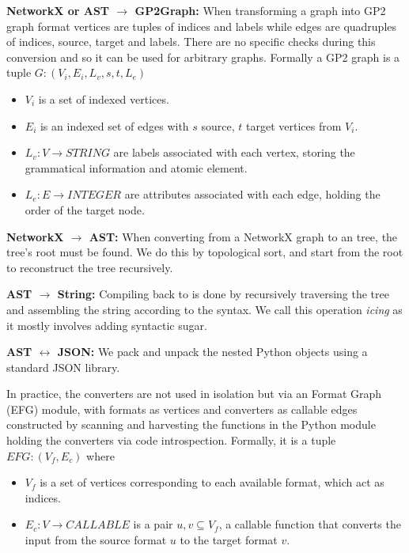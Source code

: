 \documentclass[runningheads]{llncs}
\begin{document}
\noindent \textbf{NetworkX or \essence AST $\rightarrow$  GP2Graph:} When transforming a graph into GP2 graph format vertices are tuples of indices and labels while edges are quadruples of indices, source, target and labels. There are no \essence specific checks during this conversion and so it can be used for arbitrary graphs. Formally a GP2 graph is a tuple $G: (V_i,E_i,L_v,s,t,L_e)$
\begin{itemize}
    \item $V_i$ is a set of indexed vertices.
    \item $E_i$ is an indexed set of edges with $s$ source, $t$ target vertices from $V_i$.
    \item $L_v : V \rightarrow STRING$ are labels associated with each vertex, storing the grammatical information and atomic element.
    \item $L_e : E \rightarrow INTEGER$ are attributes associated with each edge, holding the order of the target node.
\end{itemize}


\noindent\textbf{NetworkX $\rightarrow$ \essence AST:} When converting from a NetworkX graph to an \essence tree, the tree's root must be found. We do this by topological sort, and start from the root to reconstruct the tree recursively.

\noindent\textbf{\essence AST $\rightarrow$ \essence String:} Compiling back to \essence is done by recursively traversing the tree and assembling the string according to the \essence syntax. We call this operation \textit{icing} as it mostly involves adding syntactic sugar.

\noindent\textbf{\essence AST $\leftrightarrow$ JSON:} We pack and unpack the nested Python objects using a standard JSON library.


In practice, the converters are not used in isolation but via an \essence Format Graph (EFG) module, with formats as vertices and converters as callable edges constructed by scanning and harvesting the functions in the Python module holding the converters via code introspection. Formally, it is a tuple $EFG : (V_f, E_c)$ where
\begin{itemize}
    \item $V_f$ is a set of vertices corresponding to each available format, which act as indices.
    \item $E_c : V \rightarrow CALLABLE$ is a pair $u,v \subseteq V_f$, a callable function that converts the input from the source format $u$ to the target format $v$.
\end{itemize}
\end{document}
